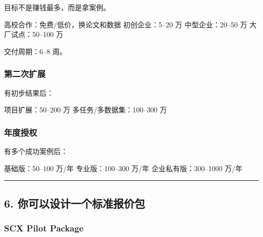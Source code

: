 \documentclass[
  12pt,
]{ctexart}
\newenvironment{Shaded}{}{}
\newcommand{\NormalTok}[1]{#1}
\begin{document}
目标不是赚钱最多，而是拿案例。

\begin{Shaded}
\begin{Highlighting}[]
\NormalTok{高校合作：免费/低价，换论文和数据}
\NormalTok{初创企业：5–20 万}
\NormalTok{中型企业：20–50 万}
\NormalTok{大厂试点：50–100 万}
\end{Highlighting}
\end{Shaded}

交付周期：6--8 周。

\subsubsection{第二次扩展}\label{ux7b2cux4e8cux6b21ux6269ux5c55}

有初步结果后：

\begin{Shaded}
\begin{Highlighting}[]
\NormalTok{项目扩展：50–200 万}
\NormalTok{多任务/多数据集：100–300 万}
\end{Highlighting}
\end{Shaded}

\subsubsection{年度授权}\label{ux5e74ux5ea6ux6388ux6743}

有多个成功案例后：

\begin{Shaded}
\begin{Highlighting}[]
\NormalTok{基础版：50–100 万/年}
\NormalTok{专业版：100–300 万/年}
\NormalTok{企业私有版：300–1000 万/年}
\end{Highlighting}
\end{Shaded}

\begin{center}\rule{0.5\linewidth}{0.5pt}\end{center}

\subsection{6.
你可以设计一个标准报价包}\label{ux4f60ux53efux4ee5ux8bbeux8ba1ux4e00ux4e2aux6807ux51c6ux62a5ux4ef7ux5305}

\subsubsection{SCX Pilot Package}\label{scx-pilot-package}
\end{document}
